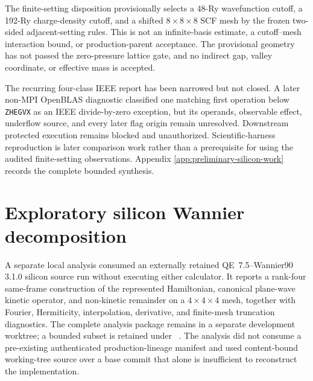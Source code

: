The finite-setting disposition provisionally selects a 48-Ry wavefunction
cutoff, a 192-Ry charge-density cutoff, and a shifted $8\times8\times8$ SCF
mesh by the frozen two-sided adjacent-setting rules. This is not an
infinite-basis estimate, a cutoff--mesh interaction bound, or production-parent
acceptance. The provisional geometry has not passed the zero-pressure lattice
gate, and no indirect gap, valley coordinate, or effective mass is accepted.

The recurring four-class IEEE report has been narrowed but not closed. A later
non-MPI OpenBLAS diagnostic classified one matching first operation below
\texttt{ZHEGVX} as an IEEE divide-by-zero exception, but its operands,
observable effect, underflow source, and every later flag origin remain
unresolved. Downstream protected execution remains blocked and unauthorized.
Scientific-harness reproduction is later comparison work rather than a
prerequisite for using the audited finite-setting observations. Appendix
\ref{app:preliminary-silicon-work} records the complete bounded synthesis.

\section{Exploratory silicon Wannier decomposition}


A separate local analysis consumed an externally retained QE~7.5--Wannier90
3.1.0 silicon source run without executing either calculator. It reports a
rank-four same-frame construction of the represented Hamiltonian, canonical
plane-wave kinetic operator, and non-kinetic remainder on a $4\times4\times4$
mesh, together with Fourier, Hermiticity, interpolation, derivative, and
finite-mesh truncation diagnostics. The complete analysis package remains in a
separate development worktree; a bounded subset is retained under
\
. The analysis did not consume a
pre-existing authenticated production-lineage manifest and used content-bound
working-tree source over a base commit that alone is insufficient to reconstruct
the implementation.

